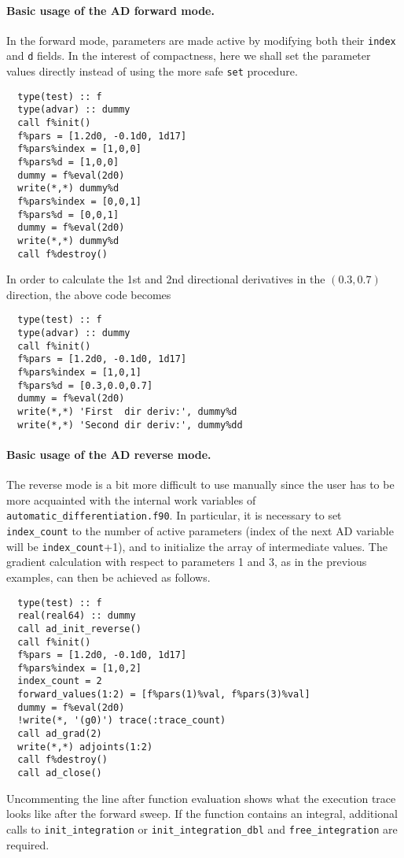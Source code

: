 \documentclass{article}
\begin{document}
\paragraph{Basic usage of the AD forward mode.} In the forward mode,
parameters are made active by modifying both their \texttt{index} and
\texttt{d} fields. In the interest of compactness, here we shall set
the parameter values directly instead of using the more safe
\texttt{set} procedure.
\begin{verbatim}
  type(test) :: f
  type(advar) :: dummy
  call f%init()
  f%pars = [1.2d0, -0.1d0, 1d17]
  f%pars%index = [1,0,0]
  f%pars%d = [1,0,0]
  dummy = f%eval(2d0)
  write(*,*) dummy%d
  f%pars%index = [0,0,1]
  f%pars%d = [0,0,1]
  dummy = f%eval(2d0)
  write(*,*) dummy%d
  call f%destroy()
\end{verbatim}
In order to calculate the 1st and 2nd directional
derivatives in the $(0.3,0.7)$ direction, the above code becomes
\begin{verbatim}
  type(test) :: f
  type(advar) :: dummy
  call f%init()
  f%pars = [1.2d0, -0.1d0, 1d17]
  f%pars%index = [1,0,1]
  f%pars%d = [0.3,0.0,0.7]
  dummy = f%eval(2d0)
  write(*,*) 'First  dir deriv:', dummy%d
  write(*,*) 'Second dir deriv:', dummy%dd
\end{verbatim}

\paragraph{Basic usage of the AD reverse mode.} The reverse mode is a
bit more difficult to use manually since the user has to be more
acquainted with the internal work variables of
\verb+automatic_differentiation.f90+. In particular, it is necessary
to set \verb+index_count+ to the number of active parameters (index of
the next AD variable will be \verb+index_count++1), and to initialize
the array of intermediate values. The gradient calculation with
respect to parameters 1 and 3, as in the previous examples, can then
be achieved as follows.
\begin{verbatim}
  type(test) :: f
  real(real64) :: dummy
  call ad_init_reverse()
  call f%init()
  f%pars = [1.2d0, -0.1d0, 1d17]
  f%pars%index = [1,0,2]
  index_count = 2
  forward_values(1:2) = [f%pars(1)%val, f%pars(3)%val]
  dummy = f%eval(2d0)
  !write(*, '(g0)') trace(:trace_count)
  call ad_grad(2)
  write(*,*) adjoints(1:2)
  call f%destroy()
  call ad_close()
\end{verbatim}
Uncommenting the line after function evaluation shows what the
execution trace looks like after the forward sweep. If the function
contains an integral, additional calls to \verb+init_integration+ or
\verb+init_integration_dbl+ and \verb+free_integration+ are required.
\end{document}
